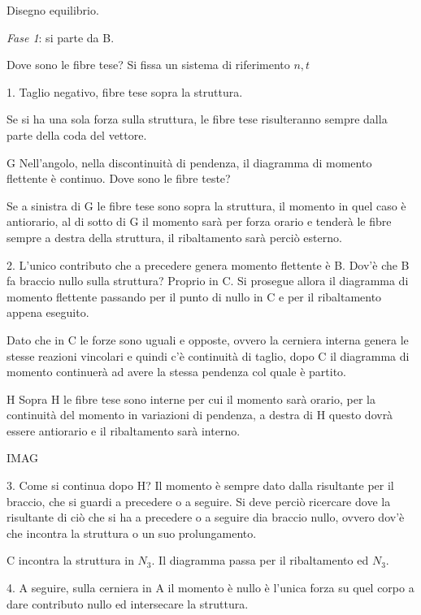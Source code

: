 \documentclass{article}
\begin{document}
\begin{adjustwidth}{2in}{}
	Disegno equilibrio.
	
	\textit{Fase 1}: si parte da B. 
	
	Dove sono le fibre tese? Si fissa un sistema di riferimento $n,t$ 
	
	\item[1.] Taglio negativo, fibre tese sopra la struttura. 
	
	Se si ha una sola forza sulla struttura, le fibre tese risulteranno sempre dalla parte della coda del vettore. 
	
	\item[G] Nell'angolo, nella discontinuità di pendenza, il diagramma di momento flettente è continuo. Dove sono le fibre teste?
	
	Se a sinistra di G le fibre tese sono sopra la struttura, il momento in quel caso è antiorario, al di sotto di G il momento sarà per forza orario e tenderà le fibre sempre a destra della struttura, il ribaltamento sarà perciò esterno. 
	
	\item[2.] L'unico contributo che a precedere genera momento flettente è B. Dov'è che B fa braccio nullo sulla struttura? Proprio in C. Si prosegue allora il diagramma di momento flettente passando per il punto di nullo in C e per il ribaltamento appena eseguito. 
	
	Dato che in C le forze sono uguali e opposte, ovvero la cerniera interna genera le stesse reazioni vincolari e quindi c'è continuità di taglio, dopo C il diagramma di momento continuerà ad avere la stessa pendenza col quale è partito. 
	
	\item[H] Sopra H le fibre tese sono interne per cui il momento sarà orario, per la continuità del momento in variazioni di pendenza, a destra di H questo dovrà essere antiorario e il ribaltamento sarà interno. 
	
	IMAG
	
	\item[3.] Come si continua dopo H? Il momento è sempre dato dalla risultante per il braccio, che si guardi a precedere o a seguire. Si deve perciò ricercare dove la risultante di ciò che si ha a precedere o a seguire dia braccio nullo, ovvero dov'è che incontra la struttura o un suo prolungamento. 
	
	C incontra la struttura in $N_3$. Il diagramma passa per il ribaltamento ed $N_3$.
	
	\item[4.] A seguire, sulla cerniera in A il momento è nullo è l'unica forza su quel corpo a dare contributo nullo ed intersecare la struttura. 
	

\end{adjustwidth}
\end{document}
